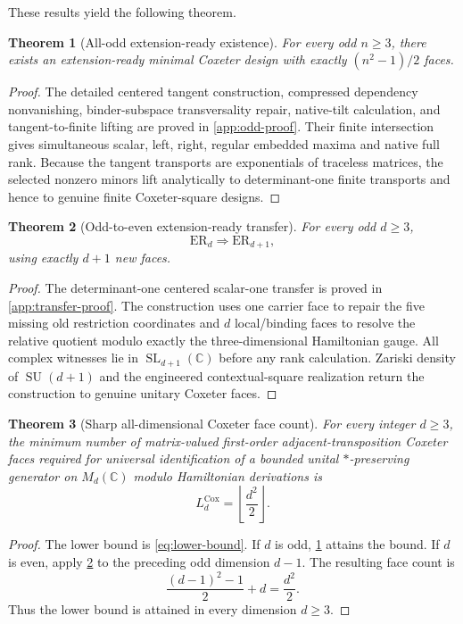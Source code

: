 \documentclass[11pt]{article}
\newtheorem{theorem}{Theorem}[section]
\theoremstyle{definition}
\theoremstyle{remark}
\newcommand{\Cox}{\mathrm{Cox}}
\newcommand{\SL}{\operatorname{SL}}
\newcommand{\SU}{\operatorname{SU}}
\begin{document}
These results yield the following theorem.

\begin{theorem}[All-odd extension-ready existence]\label{thm:all-odd-er}
For every odd $n\ge3$, there exists an extension-ready minimal Coxeter design with exactly $(n^2-1)/2$ faces.
\end{theorem}
\begin{proof}
The detailed centered tangent construction, compressed dependency nonvanishing, binder-subspace transversality repair, native-tilt calculation, and tangent-to-finite lifting are proved in \cref{app:odd-proof}. Their finite intersection gives simultaneous scalar, left, right, regular embedded maxima and native full rank. Because the tangent transports are exponentials of traceless matrices, the selected nonzero minors lift analytically to determinant-one finite transports and hence to genuine finite Coxeter-square designs.
\end{proof}

\begin{theorem}[Odd-to-even extension-ready transfer]\label{thm:odd-even}
For every odd $d\ge3$,
\begin{equation}\label{eq:er-transfer}
\mathrm{ER}_d\Longrightarrow \mathrm{ER}_{d+1},
\end{equation}
using exactly $d+1$ new faces.
\end{theorem}
\begin{proof}
The determinant-one centered scalar-one transfer is proved in \cref{app:transfer-proof}. The construction uses one carrier face to repair the five missing old restriction coordinates and $d$ local/binding faces to resolve the relative quotient modulo exactly the three-dimensional Hamiltonian gauge. All complex witnesses lie in $\SL_{d+1}(\mathbb C)$ before any rank calculation. Zariski density of $\SU(d+1)$ and the engineered contextual-square realization return the construction to genuine unitary Coxeter faces.
\end{proof}

\begin{theorem}[Sharp all-dimensional Coxeter face count]\label{thm:sharp}
For every integer $d\ge3$, the minimum number of matrix-valued first-order adjacent-transposition Coxeter faces required for universal identification of a bounded unital $*$-preserving generator on $M_d(\mathbb C)$ modulo Hamiltonian derivations is
\begin{equation}\label{eq:sharp}
\boxed{L_d^{\Cox}=\left\lfloor\frac{d^2}{2}\right\rfloor.}
\end{equation}
\end{theorem}
\begin{proof}
The lower bound is \eqref{eq:lower-bound}. If $d$ is odd, \cref{thm:all-odd-er} attains the bound. If $d$ is even, apply \cref{thm:odd-even} to the preceding odd dimension $d-1$. The resulting face count is
\begin{equation}\label{eq:even-count-corrected}
\frac{(d-1)^2-1}{2}+d=\frac{d^2}{2}.
\end{equation}
Thus the lower bound is attained in every dimension $d\ge3$.
\end{proof}
\end{document}
